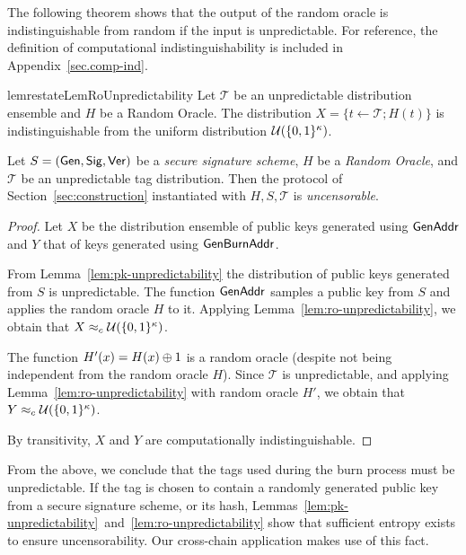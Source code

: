 The following theorem shows that the output of the random oracle is
indistinguishable from random if the input is unpredictable. For reference, the
definition of computational indistinguishability is included in
Appendix~\ref{sec.comp-ind}.

\begin{restatable}{lem}{restateLemRoUnpredictability}
  \label{lem:ro-unpredictability}
  Let $\mathcal{T}$ be an unpredictable distribution ensemble and $H$ be a
  Random Oracle.
  The distribution $X = \{t \gets \mathcal{T}; H(t)\}$ is indistinguishable from
  the uniform distribution $\mathcal{U}(\{0,1\}^\kappa)$.
\end{restatable}

\begin{theorem}[Uncensorability]
  Let $S = (\mathsf{Gen}, \mathsf{Sig}, \mathsf{Ver})$ be a \emph{secure signature scheme},
  $H$ be a \emph{Random Oracle},
  and $\mathcal{T}$ be an unpredictable tag distribution.
  Then the protocol of Section~\ref{sec:construction} instantiated with
  $H, S, \mathcal{T}$ is \emph{uncensorable}.
\end{theorem}
\begin{proof}
  Let $X$ be the distribution ensemble of public keys generated using $\mathsf{GenAddr}$
  and $Y$ that of keys generated using $\mathsf{Gen}\-\mathsf{Burn}\-\mathsf{Addr}$.

  From Lemma~\ref{lem:pk-unpredictability} the distribution of
  public keys generated from $S$ is unpredictable. The
  function $\mathsf{GenAddr}$ samples a public key from $S$ and applies the
  random oracle $H$ to it. Applying
  Lemma~\ref{lem:ro-unpredictability}, we obtain that
  $X \approx_c \mathcal{U}(\{0, 1\}^\kappa)$.

  The function $H'(x) = H(x) \oplus 1$ is a random oracle (despite not
  being independent from the random oracle $H$).
  Since $\mathcal{T}$ is unpredictable, and
  applying Lemma~\ref{lem:ro-unpredictability} with random oracle $H'$, we
  obtain that $Y \approx_c \mathcal{U}(\{0, 1\}^\kappa)$.

  By transitivity, $X$ and $Y$ are computationally indistinguishable.
\end{proof}

From the above, we conclude that the tags used during the burn process must be
unpredictable. If the tag is chosen to contain a randomly generated public key
from a secure signature scheme, or its hash,
Lemmas~\ref{lem:pk-unpredictability}~and~\ref{lem:ro-unpredictability} show that
sufficient entropy exists to ensure uncensorability. Our cross-chain application
makes use of this fact.

